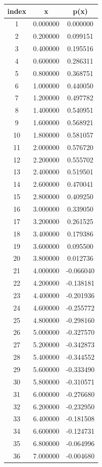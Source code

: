 \documentclass[12pt]{article}
\begin{document}
\begin{longtable}{| c | c | c |}
\hline
index & x & p(x) \\
\hline
1 & 0.000000 & 0.000000 \\ 
2 & 0.200000 & 0.099151 \\ 
3 & 0.400000 & 0.195516 \\ 
4 & 0.600000 & 0.286311 \\ 
5 & 0.800000 & 0.368751 \\ 
6 & 1.000000 & 0.440050 \\ 
7 & 1.200000 & 0.497782 \\ 
8 & 1.400000 & 0.540951 \\ 
9 & 1.600000 & 0.568921 \\ 
10 & 1.800000 & 0.581057 \\ 
11 & 2.000000 & 0.576720 \\ 
12 & 2.200000 & 0.555702 \\ 
13 & 2.400000 & 0.519501 \\ 
14 & 2.600000 & 0.470041 \\ 
15 & 2.800000 & 0.409250 \\ 
16 & 3.000000 & 0.339050 \\ 
17 & 3.200000 & 0.261525 \\ 
18 & 3.400000 & 0.179386 \\ 
19 & 3.600000 & 0.095500 \\ 
20 & 3.800000 & 0.012736 \\ 
21 & 4.000000 & -0.066040 \\ 
22 & 4.200000 & -0.138181 \\ 
23 & 4.400000 & -0.201936 \\ 
24 & 4.600000 & -0.255772 \\ 
25 & 4.800000 & -0.298160 \\ 
26 & 5.000000 & -0.327570 \\ 
27 & 5.200000 & -0.342873 \\ 
28 & 5.400000 & -0.344552 \\ 
29 & 5.600000 & -0.333490 \\ 
30 & 5.800000 & -0.310571 \\ 
31 & 6.000000 & -0.276680 \\ 
32 & 6.200000 & -0.232950 \\ 
33 & 6.400000 & -0.181508 \\ 
34 & 6.600000 & -0.124731 \\ 
35 & 6.800000 & -0.064996 \\ 
36 & 7.000000 & -0.004680 \\ 

\end{longtable}
\end{document}
